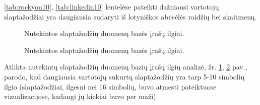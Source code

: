 \documentclass{VUMIFInfBakalaurinis}
\begin{document}
\ref{tab:rockyou10}, \ref{tab:linkedin10} lentelėse pateikti dažniausi vartotojų 
slaptažodžiai yra daugiausia sudaryti iš lotyniškos abėcėlės raidžių bei 
skaitmenų.

\begin{figure}[!ht]
  \begin{center}
  \end{center}
  \caption{
    Nutekintos slaptažodžių duomenų bazės  įrašų ilgiai.
  }
  \label{plot:rockyoulength}
\end{figure}

\begin{figure}[!ht]
  \begin{center}
  \end{center}
  \caption{
    Nutekintos slaptažodžių duomenų bazės  įrašų ilgiai.
  }
  \label{plot:linkedinlength}
\end{figure}

Atlikta nutekintų slaptažodžių duomenų bazių įrašų ilgių analizė, žr. 
\ref{plot:rockyoulength}, \ref{plot:linkedinlength} pav., parodo, kad daugiausia 
vartotojų sukurtų slaptažodžių yra tarp 5-10 simbolių ilgio (slaptažodžiai, 
ilgesni nei 16 simbolių, buvo atmesti pateiktuose vizualizacijose, kadangi jų 
kiekiai buvo per maži).
\end{document}
